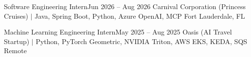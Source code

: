     \resumeSubheadingStack
      {Software Engineering Intern}{Jun 2026 -- Aug 2026}
      {Carnival Corporation (Princess Cruises) $|$ Java, Spring Boot, Python, Azure OpenAI, MCP}
      {Fort Lauderdale, FL}
      \resumeItemListStart
      \resumeItemListEnd

    \resumeSubheadingStack
      {Machine Learning Engineering Intern}{May 2025 -- Aug 2025}
      {Oasis (AI Travel Startup) $|$ Python, PyTorch Geometric, NVIDIA Triton, AWS EKS, KEDA, SQS}
      {Remote}
      \resumeItemListStart
      \resumeItemListEnd

  \resumeSubHeadingListEnd
